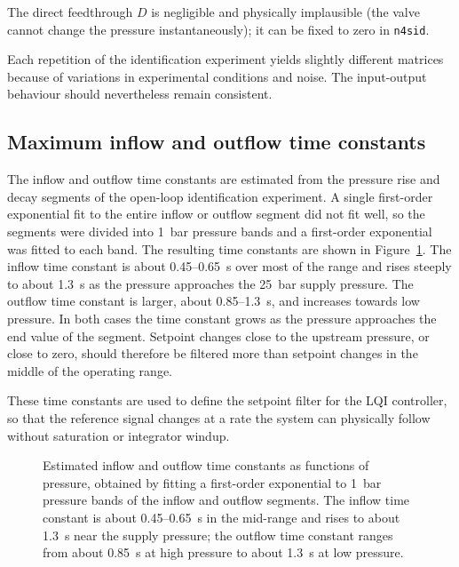\documentclass[12pt,a4paper]{article}
\begin{document}
The direct feedthrough $D$ is negligible and physically implausible (the valve cannot change the pressure instantaneously); it can be fixed to zero in \texttt{n4sid}.

Each repetition of the identification experiment yields slightly different matrices because of variations in experimental conditions and noise. The input-output behaviour should nevertheless remain consistent.

\newpage
\subsection{Maximum inflow and outflow time constants}
The inflow and outflow time constants are estimated from the pressure rise and decay segments of the open-loop identification experiment. A single first-order exponential fit to the entire inflow or outflow segment did not fit well, so the segments were divided into 1~bar pressure bands and a first-order exponential was fitted to each band. The resulting time constants are shown in Figure~\ref{fig:time_constants}. The inflow time constant is about 0.45--0.65~s over most of the range and rises steeply to about 1.3~s as the pressure approaches the 25~bar supply pressure. The outflow time constant is larger, about 0.85--1.3~s, and increases towards low pressure. In both cases the time constant grows as the pressure approaches the end value of the segment. Setpoint changes close to the upstream pressure, or close to zero, should therefore be filtered more than setpoint changes in the middle of the operating range.

These time constants are used to define the setpoint filter for the LQI controller, so that the reference signal changes at a rate the system can physically follow without saturation or integrator windup.

\begin{figure}[ht]
    \centering
    
    \caption{Estimated inflow and outflow time constants as functions of pressure, obtained by fitting a first-order exponential to 1~bar pressure bands of the inflow and outflow segments. The inflow time constant is about 0.45--0.65~s in the mid-range and rises to about 1.3~s near the supply pressure; the outflow time constant ranges from about 0.85~s at high pressure to about 1.3~s at low pressure.}
    \label{fig:time_constants}
\end{figure}
\end{document}
